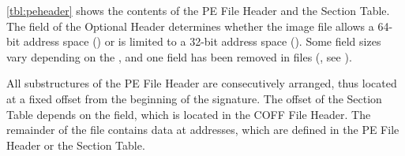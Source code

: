





\autoref{tbl:peheader} shows the contents of the PE File Header and the Section Table. The  field of the Optional Header determines  whether the image file allows a 64-bit address space (\PEplus{}) or is limited to a 32-bit address space (\PEsmall{}). Some field sizes vary depending on the , and one field has been removed in \PEplus{} files (, see \cite[18]{pespec}).

All substructures of the PE File Header are consecutively arranged, thus located at a fixed offset from the beginning of the \PE{} signature. The offset of the Section Table depends on the  field, which is located in the COFF File Header. The remainder of the \PE{} file contains data at addresses, which are defined in the PE File Header or the Section Table. 

